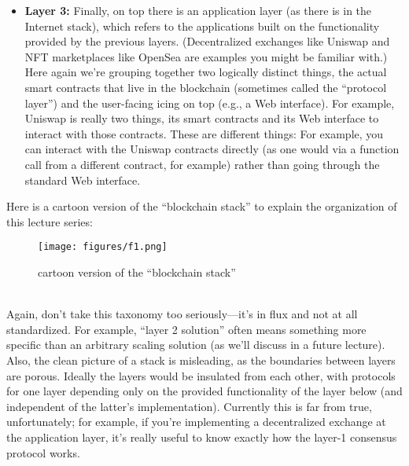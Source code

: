 \begin{itemize}
    \item \textbf{Layer 3:} Finally, on top there is an application layer (as there is in the Internet stack), which
    refers to the applications built on the functionality provided by the previous layers.
    (Decentralized exchanges like Uniswap and NFT marketplaces like OpenSea are examples you might be familiar with.) Here again we’re grouping together two logically
    distinct things, the actual smart contracts that live in the blockchain (sometimes called the “protocol layer”) and the user-facing icing on top (e.g., a Web interface). For example, Uniswap is really two things, its smart contracts and its Web interface to interact
    with those contracts. These are different things: For example, you can interact with the
    Uniswap contracts directly (as one would via a function call from a different contract,
    for example) rather than going through the standard Web interface.
\end{itemize}

Here is a cartoon version of the “blockchain stack” to explain the organization of this
lecture series:
\begin{figure}[h]
    \centering
    \texttt{[image: figures/f1.png]}
    \caption{cartoon version of the “blockchain stack”}
    \label{fig:mesh1}
\end{figure}\\

Again, don’t take this taxonomy too seriously—it’s in flux and not at all standardized. For
example, “layer 2 solution” often means something more specific than an arbitrary scaling
solution (as we’ll discuss in a future lecture). Also, the clean picture of a stack is misleading,
as the boundaries between layers are porous. Ideally the layers would be insulated from
each other, with protocols for one layer depending only on the provided functionality of
the layer below (and independent of the latter’s implementation). Currently this is far
from true, unfortunately; for example, if you’re implementing a decentralized exchange at
the application layer, it’s really useful to know exactly how the layer-1 consensus protocol
works.


